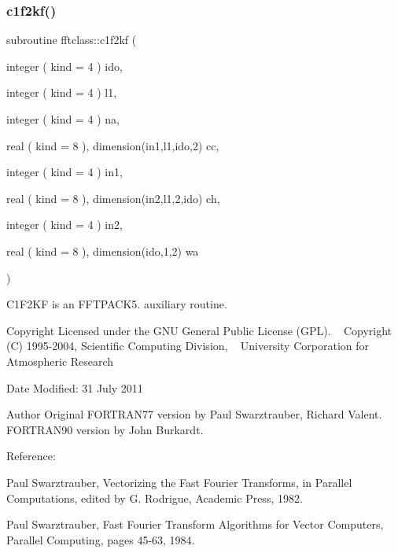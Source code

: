 \subsubsection{\texorpdfstring{c1f2kf()}{c1f2kf()}}
{\footnotesize\ttfamily subroutine fftclass\+::c1f2kf (\begin{DoxyParamCaption}\item[{integer ( kind = 4 )}]{ido,  }\item[{integer ( kind = 4 )}]{l1,  }\item[{integer ( kind = 4 )}]{na,  }\item[{real ( kind = 8 ), dimension(in1,l1,ido,2)}]{cc,  }\item[{integer ( kind = 4 )}]{in1,  }\item[{real ( kind = 8 ), dimension(in2,l1,2,ido)}]{ch,  }\item[{integer ( kind = 4 )}]{in2,  }\item[{real ( kind = 8 ), dimension(ido,1,2)}]{wa }\end{DoxyParamCaption})}



C1\+F2\+KF is an F\+F\+T\+P\+A\+C\+K5. auxiliary routine. 

\begin{DoxyCopyright}{Copyright}
Licensed under the G\+NU General Public License (G\+PL). ~\newline
 Copyright (C) 1995-\/2004, Scientific Computing Division, ~\newline
 University Corporation for Atmospheric Research 
\end{DoxyCopyright}
\begin{DoxyDate}{Date}
Modified\+: 31 July 2011 
\end{DoxyDate}
\begin{DoxyAuthor}{Author}
Original F\+O\+R\+T\+R\+A\+N77 version by Paul Swarztrauber, Richard Valent. ~\newline
 F\+O\+R\+T\+R\+A\+N90 version by John Burkardt.
\end{DoxyAuthor}
\begin{DoxyVerb} Reference:
 
    Paul Swarztrauber,
    Vectorizing the Fast Fourier Transforms,
    in Parallel Computations,
    edited by G. Rodrigue,
    Academic Press, 1982.

    Paul Swarztrauber,
    Fast Fourier Transform Algorithms for Vector Computers,
    Parallel Computing, pages 45-63, 1984.\end{DoxyVerb}
 
